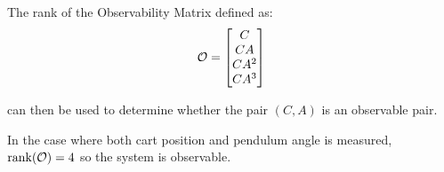 \documentclass[]{article}
\newcommand{\obsv}{\mathcal{O}}
\begin{document}
		The rank of the Observability Matrix defined as:
		\begin{equation}
			\obsv = \mqty[C\\ CA\\ CA^2\\ CA^3] \label{eq:Vdef}
		\end{equation}
		
		can then be used to determine whether the pair $(C, A)$ is an observable pair.
		
		In the case where both cart position and pendulum angle is measured, $\rank(\obsv) = 4$ so the system is observable.
		
		
%			
%		
%		
%		
%			
\end{document}
